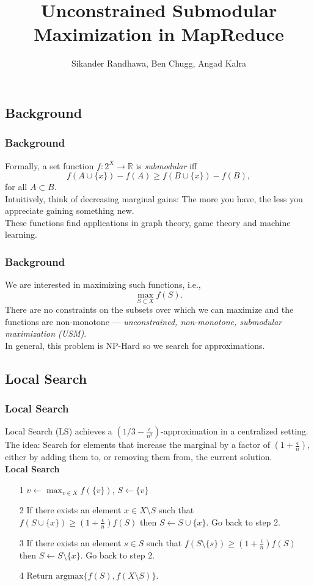 \documentclass{beamer}
\title{Unconstrained Submodular Maximization in MapReduce}
\author{Sikander Randhawa, Ben Chugg, Angad Kalra}
\institute{\textsc{The university of British Columbia \\ Vancouver, Canada}}
\date{}
\newcommand{\R}{\mathbb{R}}
\newcommand{\am}{\text{argmax}}
\begin{document}
\begin{frame}
\titlepage
\end{frame}

\begin{frame}
\section{Background}
\frametitle{Background}
Formally, a set function $f:2^X\rightarrow \R$ is \textit{submodular} iff 
\[f(A\cup \{x\})-f(A) \geq f(B\cup\{x\})-f(B),\]
for all $A\subset B$. \\
\vspace{0.4cm}
Intuitively, think of decreasing marginal gains: The more you have, the less you appreciate gaining something new. \\
\vspace{0.4cm}
These functions find applications in graph theory, game theory and machine learning. 
\end{frame}

\begin{frame}
\frametitle{Background}
We are interested in maximizing such functions, i.e., 
\[\max_{S\subset X}f(S).\]
There are no constraints on the subsets over which we can maximize and the functions are non-monotone --- \textit{unconstrained, non-monotone,  submodular maximization (USM)}. \\
\vspace{0.4cm}
In general, this problem is NP-Hard so we search for approximations. 
\end{frame}

\begin{frame}
\section{Local Search}
\frametitle{Local Search}
Local Search (LS) achieves a $(1/3-\frac{\epsilon}{n^2})$-approximation in a centralized setting. The idea: Search for elements that increase the marginal by a factor of $(1+\frac{\epsilon}{n})$, either by adding them to, or removing them from, the current solution. \\
\vspace{0.3cm}
\textbf{Local Search}
\begin{enumerate}
\item[1] $v\gets \max_{v\in X}f(\{v\})$, $S\gets\{v\}$ 
\item[2] If there exists an element $x\in X\setminus S$ such that $f(S\cup \{x\})\geq (1+\frac{\epsilon}{n})f(S)$ then $S\gets S\cup\{x\}$. Go back to step 2. 
\item[3] If there exists an element $s\in S$ such that $f(S\setminus\{s\})\geq (1+\frac{\epsilon}{n})f(S)$ then $S\gets S\setminus \{x\}$. Go back to step 2. 
\item[4] Return $\am\{f(S),f(X\setminus S)\}$. 
\end{enumerate}
\end{frame}
\end{document}
